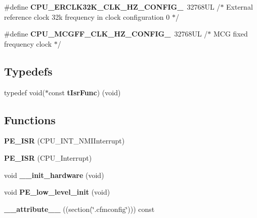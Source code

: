 \begin{DoxyCompactItemize}
\item 
\mbox{\label{group___c_p_u__module_ga092702a75fd1041eb311850abb022240}} 
\#define {\bfseries C\+P\+U\+\_\+\+E\+R\+C\+L\+K32\+K\+\_\+\+C\+L\+K\+\_\+\+H\+Z\+\_\+\+C\+O\+N\+F\+I\+G\+\_}~32768\+U\+L /$\ast$ External reference clock 32k frequency in clock configuration 0 $\ast$/
\item 
\mbox{\label{group___c_p_u__module_gafd8ec2ac4ea47574f95d0e5a6f80807e}} 
\#define {\bfseries C\+P\+U\+\_\+\+M\+C\+G\+F\+F\+\_\+\+C\+L\+K\+\_\+\+H\+Z\+\_\+\+C\+O\+N\+F\+I\+G\+\_}~32768\+U\+L /$\ast$ M\+C\+G fixed frequency clock $\ast$/
\end{DoxyCompactItemize}
\subsection*{Typedefs}
\begin{DoxyCompactItemize}
\item 
\mbox{\label{group___c_p_u__module_gafea04d3e8135767c03ce099f02e97437}} 
typedef void($\ast$const {\bfseries t\+Isr\+Func}) (void)
\end{DoxyCompactItemize}
\subsection*{Functions}
\begin{DoxyCompactItemize}
\item 
\mbox{\label{group___c_p_u__module_ga67e4ab6e892671366e6f93ea9e2a8e89}} 
{\bfseries P\+E\+\_\+\+I\+SR} (C\+P\+U\+\_\+\+I\+N\+T\+\_\+\+N\+M\+I\+Interrupt)
\item 
\mbox{\label{group___c_p_u__module_gad49e63bd2371ab371f1ae04a3e2fcf4e}} 
{\bfseries P\+E\+\_\+\+I\+SR} (C\+P\+U\+\_\+\+Interrupt)
\item 
\mbox{\label{group___c_p_u__module_ga32a8d86789a3326b3120bf1e1c1d4252}} 
void {\bfseries \+\_\+\+\_\+init\+\_\+hardware} (void)
\item 
\mbox{\label{group___c_p_u__module_ga95039f54c45f24c1b4ed640fa2f63f11}} 
void {\bfseries P\+E\+\_\+low\+\_\+level\+\_\+init} (void)
\item 
\mbox{\label{group___c_p_u__module_ga2d9b5b981f451cdf47bf43b4f9cc9e03}} 
{\bfseries \+\_\+\+\_\+attribute\+\_\+\+\_\+} ((section(\char`\"{}.cfmconfig\char`\"{}))) const
\end{DoxyCompactItemize}
